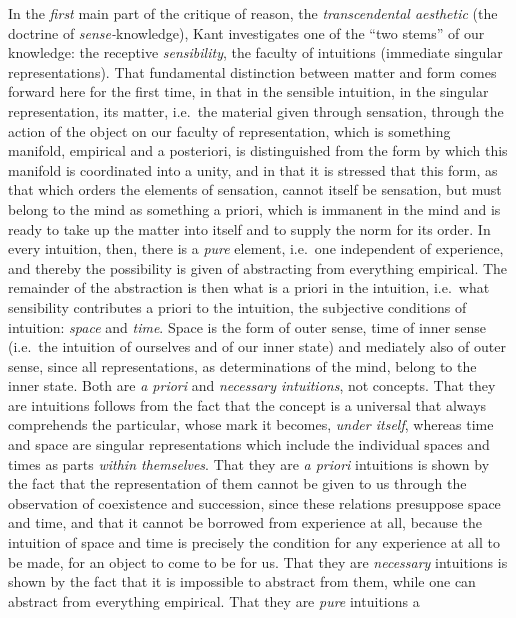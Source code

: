 In the \emph{first} main part of the critique of reason, the
\emph{transcendental aesthetic} (the doctrine of \emph{sense-}knowledge),
Kant investigates one of the ``two stems'' of our knowledge: the
receptive \emph{sensibility}, the faculty of intuitions (immediate
singular representations). That fundamental distinction between matter
and form comes forward here for the first time, in that in the sensible
intuition, in the singular representation, its matter, i.e.\ the
material given through sensation, through the action of the object on
our faculty of representation, which is something manifold,
empirical and a posteriori, is distinguished from the form by which
this manifold is coordinated into a unity, and in that it is stressed
that this form, as that which orders the elements of sensation, cannot
itself be sensation, but must belong to the mind as something a priori,
which is immanent in the mind and is ready to take up the matter into
itself and to supply the norm for its order. In every intuition, then,
there is a \emph{pure} element, i.e.\ one independent of experience,
and thereby the possibility is given of abstracting from everything
empirical. The remainder of the abstraction is then what is a priori in
the intuition, i.e.\ what sensibility contributes a priori to the
intuition, the subjective conditions of intuition: \emph{space} and
\emph{time}. Space is the form of outer sense, time of inner sense
(i.e.\ the intuition of ourselves and of our inner state) and mediately
also of outer sense, since all representations, as determinations of
the mind, belong to the inner state. Both are \emph{a priori} and
\emph{necessary intuitions}, not concepts. That they are intuitions
follows from the fact that the concept is a universal that always
comprehends the particular, whose mark it becomes, \emph{under itself},
whereas time and space are singular representations which include the
individual spaces and times as parts \emph{within themselves}. That
they are \emph{a priori} intuitions is shown by the fact that the
representation of them cannot be given to us through the observation of
coexistence and succession, since these relations presuppose space and
time, and that it cannot be borrowed from experience at all, because
the intuition of space and time is precisely the condition for any
experience at all to be made, for an object to come to be for us. That
they are \emph{necessary} intuitions is shown by the fact that it is
impossible to abstract from them, while one can abstract from
everything empirical. That they are \emph{pure} intuitions a
